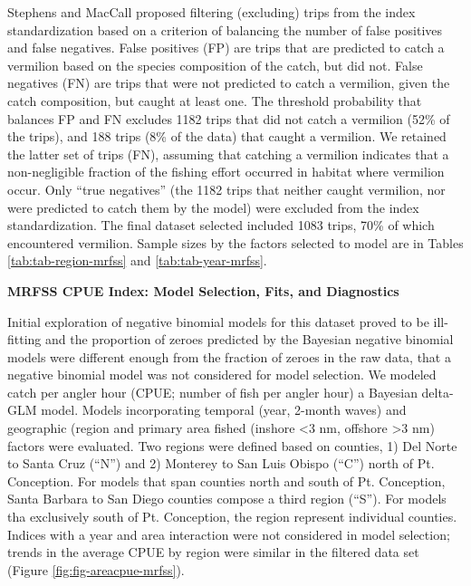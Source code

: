 \documentclass[11pt,
  english,
  a4paper,
]{article}
\begin{document}
Stephens and MacCall proposed filtering (excluding) trips from the index standardization based on a criterion of balancing the number of false positives and false negatives. False positives (FP) are trips that are predicted to catch a vermilion based on the species composition of the catch, but did not. False negatives (FN) are trips that were not predicted to catch a vermilion, given the catch composition, but caught at least one. The threshold probability that balances FP and FN excludes 1182 trips that did not catch a vermilion (52\% of the trips), and 188 trips (8\% of the data) that caught a vermilion. We retained the latter set of trips (FN), assuming that catching a vermilion indicates that a non-negligible fraction of the fishing effort occurred in habitat where vermilion occur. Only ``true negatives'' (the 1182 trips that neither caught vermilion, nor were predicted to catch them by the model) were excluded from the index standardization. The final dataset selected included 1083 trips, 70\% of which encountered vermilion. Sample sizes by the factors selected to model are in Tables \ref{tab:tab-region-mrfss} and \ref{tab:tab-year-mrfss}.

\textbf{MRFSS CPUE Index: Model Selection, Fits, and Diagnostics}

Initial exploration of negative binomial models for this dataset proved to be ill-fitting and the proportion of zeroes predicted by the Bayesian negative binomial models were different enough from the fraction of zeroes in the raw data, that a negative binomial model was not considered for model selection. We modeled catch per angler hour (CPUE; number of fish per angler hour) a Bayesian delta-GLM model. Models incorporating temporal (year, 2-month waves) and geographic (region and primary area fished (inshore \textless3 nm, offshore \textgreater3 nm) factors were evaluated. Two regions were defined based on counties, 1) Del Norte to Santa Cruz (``N'') and 2) Monterey to San Luis Obispo (``C'') north of Pt. Conception. For models that span counties north and south of Pt. Conception, Santa Barbara to San Diego counties compose a third region (``S''). For models tha exclusively south of Pt. Conception, the region represent individual counties. Indices with a year and area interaction were not considered in model selection; trends in the average CPUE by region were similar in the filtered data set (Figure \ref{fig:fig-areacpue-mrfss}).
\end{document}
